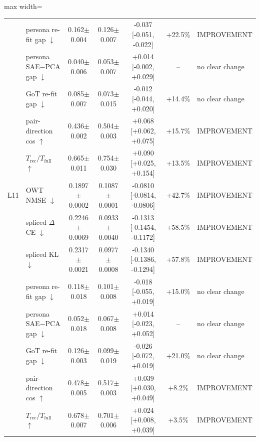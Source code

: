 \begin{table}[t]
\begin{adjustbox}{max width=\linewidth}
\begin{tabular}{llccccl}
 & persona re-fit gap $\downarrow$ & 0.162$\pm$0.004 & 0.126$\pm$0.007 & -0.037 [-0.051, -0.022] & +22.5\% & IMPROVEMENT \\
 & persona SAE$-$PCA gap $\downarrow$ & 0.040$\pm$0.006 & 0.053$\pm$0.007 & +0.014 [-0.002, +0.029] & -- & no clear change \\
 & GoT re-fit gap $\downarrow$ & 0.085$\pm$0.007 & 0.073$\pm$0.015 & -0.012 [-0.044, +0.020] & +14.4\% & no clear change \\
 & pair-direction cos $\uparrow$ & 0.436$\pm$0.002 & 0.504$\pm$0.003 & +0.068 [+0.062, +0.075] & +15.7\% & IMPROVEMENT \\
 & $T_{\text{rec}}/T_{\text{full}}$ $\uparrow$ & 0.665$\pm$0.011 & 0.754$\pm$0.030 & +0.090 [+0.025, +0.154] & +13.5\% & IMPROVEMENT \\
\midrule
L11 & OWT NMSE $\downarrow$ & 0.1897$\pm$0.0002 & 0.1087$\pm$0.0001 & -0.0810 [-0.0814, -0.0806] & +42.7\% & IMPROVEMENT \\
 & spliced $\Delta$CE $\downarrow$ & 0.2246$\pm$0.0069 & 0.0933$\pm$0.0040 & -0.1313 [-0.1454, -0.1172] & +58.5\% & IMPROVEMENT \\
 & spliced KL $\downarrow$ & 0.2317$\pm$0.0021 & 0.0977$\pm$0.0008 & -0.1340 [-0.1386, -0.1294] & +57.8\% & IMPROVEMENT \\
 & persona re-fit gap $\downarrow$ & 0.118$\pm$0.018 & 0.101$\pm$0.008 & -0.018 [-0.055, +0.019] & +15.0\% & no clear change \\
 & persona SAE$-$PCA gap $\downarrow$ & 0.052$\pm$0.018 & 0.067$\pm$0.008 & +0.014 [-0.023, +0.052] & -- & no clear change \\
 & GoT re-fit gap $\downarrow$ & 0.126$\pm$0.003 & 0.099$\pm$0.019 & -0.026 [-0.072, +0.019] & +21.0\% & no clear change \\
 & pair-direction cos $\uparrow$ & 0.478$\pm$0.005 & 0.517$\pm$0.003 & +0.039 [+0.030, +0.049] & +8.2\% & IMPROVEMENT \\
 & $T_{\text{rec}}/T_{\text{full}}$ $\uparrow$ & 0.678$\pm$0.007 & 0.701$\pm$0.006 & +0.024 [+0.008, +0.039] & +3.5\% & IMPROVEMENT \\
\bottomrule
\end{tabular}
\end{adjustbox}
\end{table}
